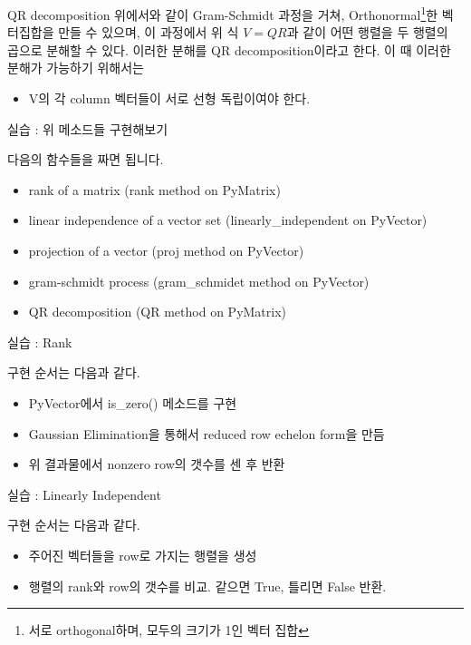 \documentclass{beamer}
\begin{document}
\begin{frame}{QR decomposition} 
위에서와 같이 Gram-Schmidt 과정을 거쳐, Orthonormal\footnote{서로 orthogonal하며, 모두의 크기가 1인 벡터 집합}한 벡터집합을 만들 수 있으며, 이 과정에서 위 식 $V=QR$과 같이 어떤 행렬을 두 행렬의 곱으로 분해할 수 있다. 이러한 분해를 QR decomposition이라고 한다. 이 때 이러한 분해가 가능하기 위해서는 

\begin{itemize} 
\item V의 각 column 벡터들이 서로 선형 독립이여야 한다. 
\end{itemize}
\end{frame}

\begin{frame}{실습 : 위 메소드들 구현해보기} 

다음의 함수들을 짜면 됩니다. 

\begin{itemize} 
\item rank of a matrix (rank method on PyMatrix)
\item linear independence of a vector set (linearly\_independent on PyVector)
\item projection of a vector (proj method on PyVector)
\item gram-schmidt process (gram\_schmidet method on PyVector)
\item QR decomposition (QR method on PyMatrix)
\end{itemize}

\end{frame}


\begin{frame}{실습 : Rank}

구현 순서는 다음과 같다. 
\begin{itemize} 
\item PyVector에서 is\_zero() 메소드를 구현 
\item Gaussian Elimination을 통해서 reduced row echelon form을 만듬 
\item 위 결과물에서 nonzero row의 갯수를 센 후 반환
\end{itemize}
\end{frame}


\begin{frame}{실습 : Linearly Independent}

구현 순서는 다음과 같다. 
\begin{itemize} 
\item 주어진 벡터들을 row로 가지는 행렬을 생성 
\item 행렬의 rank와 row의 갯수를 비교. 같으면 True, 틀리면 False 반환. 
\end{itemize}
\end{frame}
\end{document}
